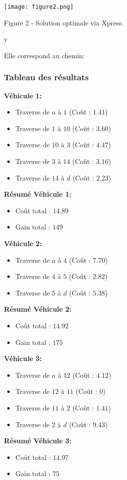 \documentclass[a4paper, 12pt, DIV=12]{scrartcl}
\begin{document}
\texttt{[image: figure2.png]}
\begin{center}
Figure 2 - Solution optimale via Xpress. 
\end{center}y

Elle correspond au chemin:
\subsubsection{Tableau des résultats}

\textbf{Véhicule 1:}
\begin{itemize}
    \item Traverse de $a$ à $1$ (Coût : $1.41$)
    \item Traverse de $1$ à $10$ (Coût : $3.60$)
    \item Traverse de $10$ à $3$ (Coût : $4.47$)
    \item Traverse de $3$ à $14$ (Coût : $3.16$)
    \item Traverse de $14$ à $d$ (Coût : $2.23$)
\end{itemize}
\textbf{Résumé Véhicule 1:}
\begin{itemize}
    \item Coût total : $14.89$
    \item Gain total : $149$
\end{itemize}

\textbf{Véhicule 2:}
\begin{itemize}
    \item Traverse de $a$ à $4$ (Coût : $7.70$)
    \item Traverse de $4$ à $5$ (Coût : $2.82$)
    \item Traverse de $5$ à $d$ (Coût : $5.38$)
\end{itemize}
\textbf{Résumé Véhicule 2:}
\begin{itemize}
    \item Coût total : $14.92$
    \item Gain total : $175$
\end{itemize}

\textbf{Véhicule 3:}
\begin{itemize}
    \item Traverse de $a$ à $12$ (Coût : $4.12$)
    \item Traverse de $12$ à $11$ (Coût : $0$)
    \item Traverse de $11$ à $2$ (Coût : $1.41$)
    \item Traverse de $2$ à $d$ (Coût : $9.43$)
\end{itemize}
\textbf{Résumé Véhicule 3:}
\begin{itemize}
    \item Coût total : $14.97$
    \item Gain total : $75$
\end{itemize}
\end{document}

